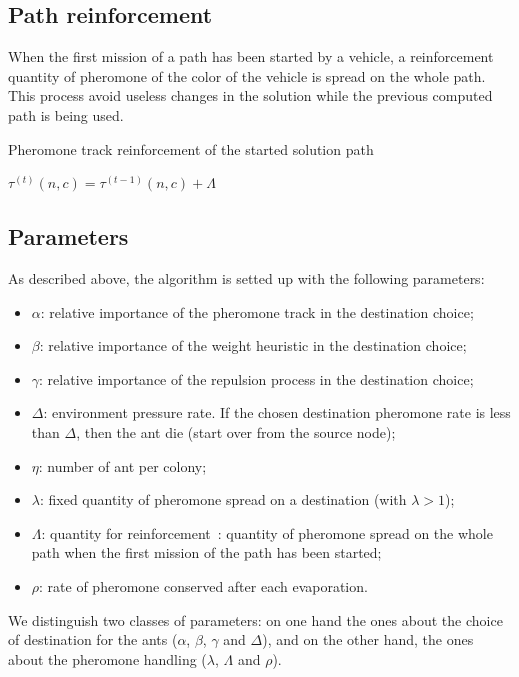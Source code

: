 \documentclass[a4paper,10pt]{article}
\begin{document}
\subsection{Path reinforcement}
When the first mission of a path has been started by a vehicle, a reinforcement quantity of pheromone of the color of the vehicle is spread on the whole path. This process avoid useless changes in the solution while the previous computed path is being used.


\begin{algorithm}
\caption{Pheromone track reinforcement of the started solution path}
\label{algoReinforcement}
\begin{algorithmic} 
\STATE $\tau^{(t)}(n,c) =  \tau^{(t-1)}(n,c) + \Lambda$
\ENDFOR
\end{algorithmic}
\end{algorithm}

\subsection{Parameters}
As described above, the algorithm is setted up with the following parameters:

\begin{itemize}
 \item $\alpha$: relative importance of the pheromone track in the destination choice;
 \item $\beta$:  relative importance of the weight heuristic in the destination choice;
 \item $\gamma$: relative importance of the repulsion process in the destination choice;
 \item $\Delta$: environment pressure rate. If the chosen destination pheromone rate is less than $\Delta$, then the ant die (start over from the source node);
 \item $\eta$: number of ant per colony;
 \item $\lambda$: fixed quantity of pheromone spread on a destination (with $\lambda > 1$);
 \item $\Lambda$: quantity for reinforcement : quantity of pheromone spread on the whole path when the first mission of the path has been started;
 \item $\rho$: rate of pheromone conserved after each evaporation.
\end{itemize}

We distinguish two classes of parameters: on one hand the ones about the choice of destination for the ants ($\alpha$, $\beta$, $\gamma$ and $\Delta$), and on the other hand, the ones about the pheromone handling ($\lambda$, $\Lambda$ and $\rho$).\\
\end{document}
